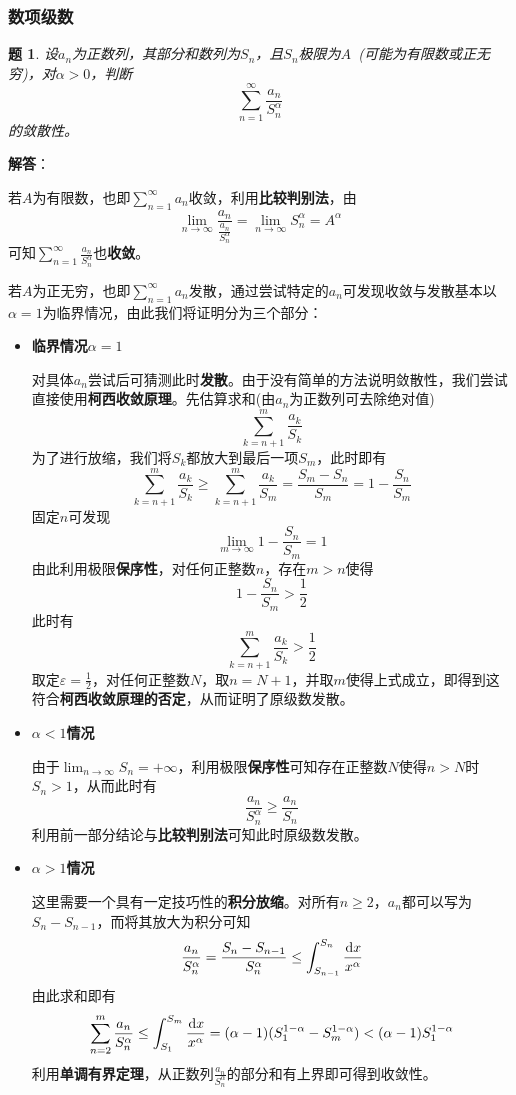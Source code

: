 \documentclass[a4paper,UTF8,fontset=windows,AutoFakeBold]{ctexart}
\newcommand*{\dr}{\hspace{0.07em}\mathrm{d}}
\newcommand*{\suminf}[1][n=1]{\sum_{#1}^\infty}
\theoremstyle{ex}
\newtheorem{exercise}{题}
\newcommand{\sol}[1]{{\vspace{5pt}\kaishu\noindent\textbf{解答}：\vspace{-3pt}
\begin{compactitem}
    \item[] #1
\end{compactitem}
}}
\begin{document}
\subsubsection{数项级数}
\begin{framed}
\begin{exercise}\label{an div sn}
    设$a_n$为正数列，其部分和数列为$S_n$，且$S_n$极限为$A$\ (可能为有限数或正无穷)，对$\alpha>0$，判断
    $$\suminf\frac{a_n}{S_n^\alpha}$$
    的敛散性。
\end{exercise}
\sol{
    若$A$为有限数，也即$\suminf a_n$收敛，利用\textbf{比较判别法}，由
    $$\lim_{n\to\infty}\frac{a_n}{\frac{a_n}{S_n^\alpha}}=\lim_{n\to\infty}S_n^\alpha=A^\alpha$$
    可知$\suminf\frac{a_n}{S_n^\alpha}$也\textbf{收敛}。

    若$A$为正无穷，也即$\suminf a_n$发散，通过尝试特定的$a_n$可发现收敛与发散基本以$\alpha=1$为临界情况，由此我们将证明分为三个部分：
    \begin{itemize}
        \item \textbf{临界情况$\alpha=1$}
        
        对具体$a_n$尝试后可猜测此时\textbf{发散}。由于没有简单的方法说明敛散性，我们尝试直接使用\textbf{柯西收敛原理}。先估算求和(由$a_n$为正数列可去除绝对值)
        $$\sum_{k=n+1}^m\frac{a_k}{S_k}$$
        为了进行放缩，我们将$S_k$都放大到最后一项$S_m$，此时即有
        $$\sum_{k=n+1}^m\frac{a_k}{S_k}\ge\sum_{k=n+1}^m\frac{a_k}{S_m}=\frac{S_m-S_n}{S_m}=1-\frac{S_n}{S_m}$$
        固定$n$可发现
        $$\lim_{m\to\infty}1-\frac{S_n}{S_m}=1$$
        由此利用极限\textbf{保序性}，对任何正整数$n$，存在$m>n$使得
        $$1-\frac{S_n}{S_m}>\frac{1}{2}$$
        此时有
        $$\sum_{k=n+1}^m\frac{a_k}{S_k}>\frac{1}{2}$$
        取定$\varepsilon=\frac{1}{2}$，对任何正整数$N$，取$n=N+1$，并取$m$使得上式成立，即得到这符合\textbf{柯西收敛原理的否定}，从而证明了原级数发散。

        \item \textbf{$\alpha<1$情况}
        
        由于$\lim_{n\to\infty}S_n=+\infty$，利用极限\textbf{保序性}可知存在正整数$N$使得$n>N$时$S_n>1$，从而此时有
        $$\frac{a_n}{S_n^\alpha}\ge\frac{a_n}{S_n}$$
        利用前一部分结论与\textbf{比较判别法}可知此时原级数发散。

        \item \textbf{$\alpha>1$情况}

        这里需要一个具有一定技巧性的\textbf{积分放缩}。对所有$n\ge2$，$a_n$都可以写为$S_n-S_{n-1}$，而将其放大为积分可知
        $$\frac{a_n}{S_n^\alpha}=\frac{S_n-S_{n-1}}{S_n^\alpha}\le\int_{S_{n-1}}^{S_n}\frac{\dr x}{x^\alpha}$$
        由此求和即有
        $$\sum_{n=2}^m\frac{a_n}{S_n^\alpha}\le\int_{S_1}^{S_m}\frac{\dr x}{x^\alpha}=(\alpha-1)(S_1^{1-\alpha}-S_m^{1-\alpha})<(\alpha-1)S_1^{1-\alpha}$$
        利用\textbf{单调有界定理}，从正数列$\frac{a_n}{S_n^\alpha}$的部分和有上界即可得到收敛性。
    \end{itemize} 
}
\end{framed}
\end{document}
